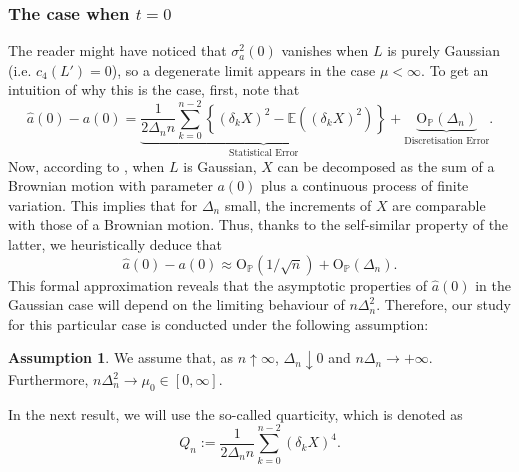 \documentclass{article}
\theoremstyle{plain}
\theoremstyle{definition}
\newtheorem{assumption}{Assumption}
\theoremstyle{remark}
\begin{document}
\subsubsection{The case when $t=0$}
The reader might have noticed that $\sigma_{a}^{2}(0)$ vanishes when
$L$ is purely Gaussian (i.e. $c_{4}(L')=0$), so a degenerate limit appears in the case $\mu<\infty$. To get an intuition of why this is the case, first, note that 
\[
\hat{a}(0)-a(0)=\underbrace{\frac{1}{2\Delta_{n}n}\sum_{k=0}^{n-2}\left\{ (\delta_{k}X)^{2}-\mathbb{E}((\delta_{k}X)^{2})\right\} }_{\text{Statistical Error}}+\underbrace{\mathrm{O}_{\mathbb{P}}(\Delta_{n})}_{\text{Discretisation Error}}.
\]
Now, according to \cite{BasseRosis16}, when $L$ is Gaussian, $X$
can be decomposed as the sum of a Brownian motion with parameter $a(0)$
plus a continuous process of finite variation. This implies that for
$\Delta_{n}$ small, the increments of $X$ are comparable with those
of a Brownian motion. Thus, thanks to the self-similar property of
the latter, we heuristically deduce that 
\[
\hat{a}(0)-a(0)\approx\mathrm{O}_{\mathbb{P}}(1/\sqrt{n})+\mathrm{O}_{\mathbb{P}}(\Delta_{n}).
\]
This formal approximation reveals that the asymptotic properties
of $\hat{a}(0)$ in the Gaussian case will depend on the limiting behaviour
of $n\Delta_{n}^{2}$. Therefore, our study for this particular case
is conducted under the following  assumption: 

\begin{assumption}\label{as:samplingschemeGaussiant0} We assume
	that, as $n\uparrow\infty$, $\Delta_{n}\downarrow0$ and $n\Delta_{n}\rightarrow+\infty.$
	Furthermore, $n\Delta_{n}^{2}\rightarrow\mu_{0}\in[0,\infty]$.
	
\end{assumption} 

In the next result, we will use the so-called quarticity, which is denoted as
\begin{equation}
	Q_{n}:=\frac{1}{2\Delta_{n}n}\sum_{k=0}^{n-2}(\delta_{k}X)^{4}.\label{quarticity}
\end{equation}
\end{document}
